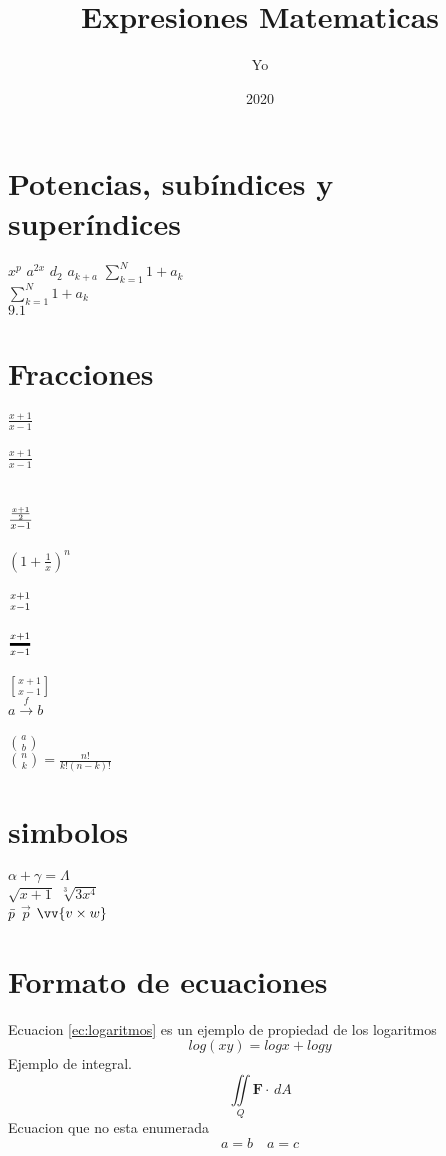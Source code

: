 \documentclass[11pt, letterpaper]{article}
\title{Expresiones Matematicas}
\author{Yo}
\date{2020}
\begin{document}
\maketitle

\section{Potencias, subíndices y superíndices}
$x^p$ $a^{2x}$ $d_2$ $a_{k+a}$ $\sum_{k=1}^N 1+a_{k}$ \\
$\displaystyle \sum_{k=1}^N 1+a_{k}$\\
$9.1$
\section{Fracciones}
$\frac{x+1}{x-1}$ \\ \\
$\displaystyle \frac{x+1}{x-1} $ \\ \\ \\ 
${{x+1} \over 2} \over x-1 $ \\ \\
$\displaystyle {\left(1+ \frac{1}{x} \right)^n}$ \\ \\
$x+1 \atop x-1$ \\ \\
$x+1 \above 2pt x-1$ \\ \\
$x+1 \brack x-1 $ \\
$\displaystyle{a \stackrel{f}{\rightarrow}b}$ \\ \\
$\displaystyle {a \choose b}$ \\
$\displaystyle\binom{n}{k}=\displaystyle\frac{n!}{k!(n-k)!}$
\section{simbolos}
$\alpha + \gamma = \Lambda$ \\
$\sqrt{x+1}$ $\sqrt[3]{3x^4}$ \\
$\Bar{p}$ $\vec{p}$ $\vv{v\times w}$
\section{Formato de ecuaciones}
Ecuacion \ref{ec:logaritmos} es un ejemplo de propiedad de los logaritmos
\begin{equation}\label{ec:logaritmos}
    log(xy)=logx+logy
\end{equation}
Ejemplo de integral.
\begin{equation}
    \iint\limits_Q\boldsymbol{F} \cdot \,dA 
\end{equation}
Ecuacion que no esta enumerada
\begin{equation*}
    a=b\quad a=c
\end{equation*}
\end{document}
